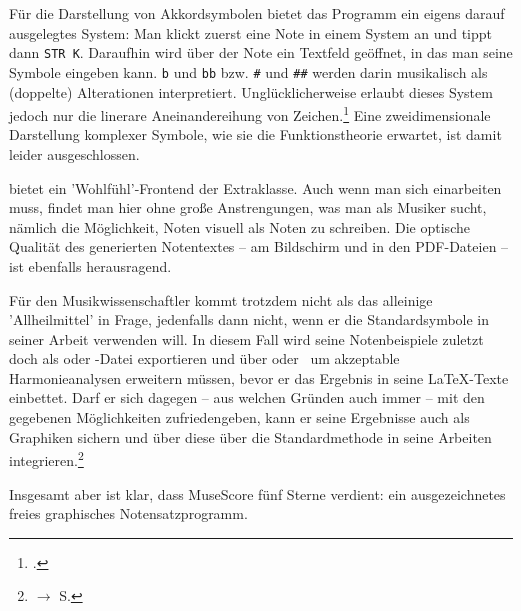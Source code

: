 Für die Darstellung von Akkordsymbolen bietet das Programm ein eigens darauf
ausgelegtes System: Man klickt zuerst eine Note in einem System an und tippt
dann \texttt{STR K}. Daraufhin wird über der Note ein Textfeld geöffnet, in das
man seine Symbole eingeben kann. \texttt{b} und \texttt{bb} bzw. \texttt{\#} und
\texttt{\#\#} werden darin musikalisch als (doppelte) Alterationen
interpretiert. Unglücklicherweise erlaubt dieses System jedoch nur die linerare
Aneinandereihung von Zeichen.\footcite[vgl.][\nopage wp]{MuseScore2019i} Eine
zweidimensionale Darstellung komplexer Symbole, wie sie die Funktionstheorie
erwartet, ist damit leider ausgeschlossen.

 bietet ein 'Wohlfühl'-Frontend der Extraklasse. Auch wenn man
sich einarbeiten muss, findet man hier ohne große Anstrengungen, was man als
Musiker sucht, nämlich die Möglichkeit, Noten visuell als Noten zu schreiben.
Die optische Qualität des generierten Notentextes -- am Bildschirm und in den
PDF-Dateien -- ist ebenfalls herausragend. 

Für den Musikwissenschaftler kommt  trotzdem nicht als das
alleinige 'Allheilmittel' in Frage, jedenfalls dann nicht, wenn er die
Standardsymbole in seiner Arbeit verwenden will. In diesem Fall  wird seine
Notenbeispiele zuletzt doch als  oder -Datei
exportieren und über  oder  \ um akzeptable
Harmonieanalysen erweitern müssen, bevor er das Ergebnis in seine \LaTeX-Texte
einbettet. Darf er sich dagegen -- aus welchen Gründen auch immer -- mit den
gegebenen Möglichkeiten zufriedengeben, kann er seine Ergebnisse auch als
Graphiken sichern und über diese über die Standardmethode in seine Arbeiten
integrieren.\footnote{$\rightarrow$ S. \pageref{IncludeGraphics}}

Insgesamt aber ist klar, dass MuseScore fünf Sterne verdient: ein
ausgezeichnetes freies graphisches Notensatzprogramm.
%
